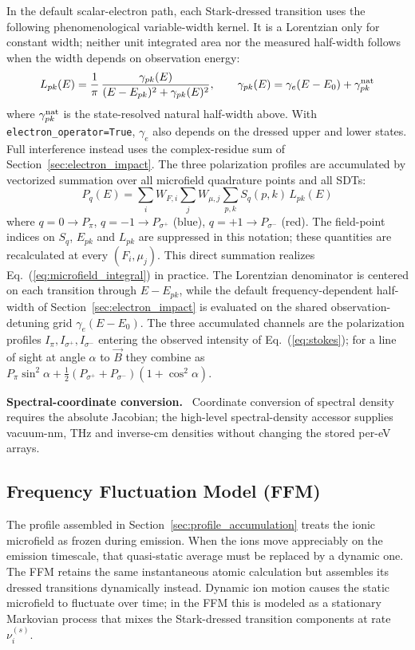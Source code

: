 \documentclass[11pt,a4paper]{article}
\newenvironment{implnote}[1][Implementation]{%
  \par\smallskip\noindent\begin{lrbox}{\notebox}\setlength{\fboxsep}{6pt}\begin{minipage}{\dimexpr\linewidth-2\fboxsep-2\fboxrule\relax}\small\textbf{#1.}\ }{%
  \end{minipage}\end{lrbox}\setlength{\fboxsep}{6pt}\fcolorbox{noteframe}{notebg}{\usebox{\notebox}}\par\smallskip}
\numberwithin{equation}{section}
\begin{document}
In the default scalar-electron path, each Stark-dressed transition uses the following phenomenological variable-width kernel. It is a Lorentzian only for constant width; neither unit integrated area nor the measured half-width follows when the width depends on observation energy:
\begin{equation}
L_{pk}(E) = \frac{1}{\pi}\,\frac{\gamma_{pk}(E)}{(E-E_{pk})^2 + \gamma_{pk}(E)^2},
\qquad \gamma_{pk}(E) = \gamma_e(E-E_0) + \gamma^{\rm nat}_{pk}
\end{equation}
where $\gamma^{\rm nat}_{pk}$ is the state-resolved natural half-width above.
With \texttt{electron\_operator=True}, $\gamma_e$ also depends on the dressed
upper and lower states. Full interference instead uses the complex-residue
sum of Section~\ref{sec:electron_impact}.
The three polarization profiles are accumulated by vectorized summation over all microfield quadrature points and all SDTs:
\begin{equation}
\label{eq:profile_sum}
P_q(E) = \sum_i W_{F,i} \sum_j W_{\mu,j} \sum_{p,k} S_q(p,k)\,L_{pk}(E)
\end{equation}
where $q{=}0 \to P_\pi$, $q{=}{-1} \to P_{\sigma^+}$ (blue), $q{=}{+1} \to P_{\sigma^-}$ (red).
The field-point indices on $S_q$, $E_{pk}$ and $L_{pk}$ are suppressed in this
notation; these quantities are recalculated at every $(F_i,\mu_j)$.
This direct summation realizes Eq.~(\ref{eq:microfield_integral}) in practice. The Lorentzian denominator is centered on each transition through $E-E_{pk}$, while the default frequency-dependent half-width of Section~\ref{sec:electron_impact} is evaluated on the shared observation-detuning grid $\gamma_e(E-E_0)$. The three accumulated channels are the polarization profiles $I_\pi, I_{\sigma^+}, I_{\sigma^-}$ entering the observed intensity of Eq.~(\ref{eq:stokes}); for a line of sight at angle $\alpha$ to $\vec{B}$ they combine as $P_\pi\sin^2\!\alpha + \tfrac{1}{2}(P_{\sigma^+}+P_{\sigma^-})(1+\cos^2\!\alpha)$.

\begin{implnote}[Spectral-coordinate conversion]
Coordinate conversion of spectral density requires the absolute Jacobian;
the high-level spectral-density accessor supplies vacuum-nm, THz and inverse-cm
densities without changing the stored per-eV arrays.
\end{implnote}

\subsection{Frequency Fluctuation Model (FFM)}
\label{sec:ffm}
The profile assembled in Section~\ref{sec:profile_accumulation} treats the ionic microfield as frozen during emission. When the ions move appreciably on the emission timescale, that quasi-static average must be replaced by a dynamic one. The FFM retains the same instantaneous atomic calculation but assembles its dressed transitions dynamically instead. Dynamic ion motion causes the static microfield to fluctuate over time; in the FFM \cite{talin} this is modeled as a stationary Markovian process that mixes the Stark-dressed transition components at rate $\nu_i^{(s)}$.
\end{document}
